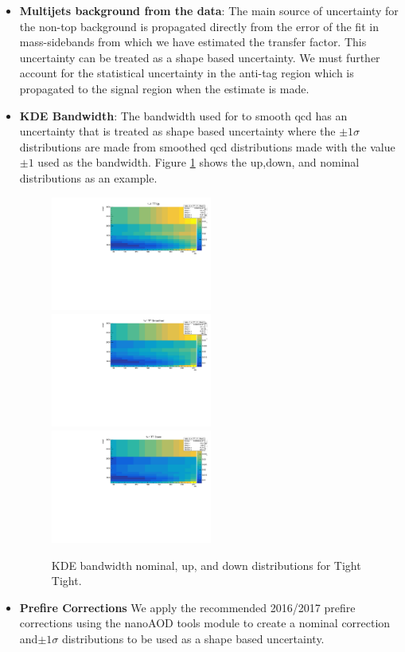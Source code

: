 \begin{itemize}
\item \textbf{Multijets background from the data}: 
The main source of uncertainty for the non-top background is propagated directly from the error of the fit in mass-sidebands from which we have estimated the transfer factor. This uncertainty can be treated as a shape based uncertainty. We must further account for the statistical uncertainty in the anti-tag region which is propagated to the signal region when the estimate is made. 

\item \textbf{KDE Bandwidth}: The bandwidth used for to smooth qcd has an uncertainty that is treated as shape based uncertainty where the $\pm 1 \sigma$ distributions are made from smoothed qcd distributions made with the value $\pm 1$ used as the bandwidth. Figure \ref{fig:KDETT} shows the up,down, and nominal distributions as an example.
\begin{figure}[!htb]
	\centering
  \includegraphics[width=0.5\textwidth]{Figures/TT_up.pdf}
	\includegraphics[width=0.5\textwidth]{Figures/TT_smoothed2.pdf}
  \includegraphics[width=0.5\textwidth]{Figures/TT_down.pdf}
	\caption{KDE bandwidth nominal, up, and down distributions for Tight Tight.}
	\label{fig:KDETT}
\end{figure}
\item \textbf{Prefire Corrections} We apply the recommended 2016/2017 prefire corrections using the nanoAOD tools module to create a nominal correction and$ \pm 1 \sigma$ distributions to be used as a shape based uncertainty.


\end{itemize}
